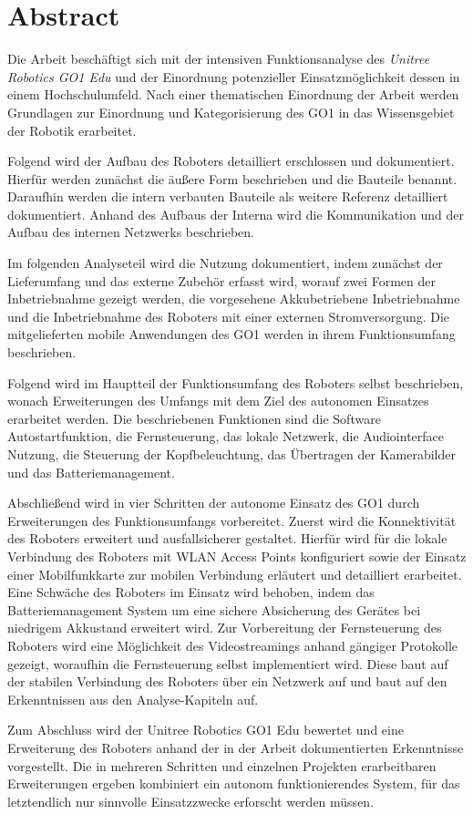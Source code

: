 \clearpage
{}
\pagestyle{empty}
\section*{Abstract}

Die Arbeit \emph{\mytitle{}} beschäftigt sich mit der intensiven Funktionsanalyse des \emph{Unitree Robotics GO1 Edu} und der
Einordnung potenzieller Einsatzmöglichkeit dessen in einem Hochschulumfeld.
Nach einer thematischen Einordnung der Arbeit werden Grundlagen zur Einordnung und Kategorisierung des GO1 in das Wissensgebiet
der Robotik erarbeitet.

Folgend wird der Aufbau des Roboters detailliert erschlossen und dokumentiert.
Hierfür werden zunächst die äußere Form beschrieben und die Bauteile benannt.
Daraufhin werden die intern verbauten Bauteile als weitere Referenz detailliert dokumentiert.
Anhand des Aufbaus der Interna wird die Kommunikation und der Aufbau des internen Netzwerks beschrieben.

Im folgenden Analyseteil wird die Nutzung dokumentiert, indem zunächst der Lieferumfang und das externe Zubehör erfasst wird, worauf zwei
Formen der Inbetriebnahme gezeigt werden, die vorgesehene Akkubetriebene Inbetriebnahme und die Inbetriebnahme
des Roboters mit einer externen Stromversorgung.
Die mitgelieferten mobile Anwendungen des GO1 werden in ihrem Funktionsumfang beschrieben.

Folgend wird im Hauptteil der Funktionsumfang des Roboters selbst beschrieben, wonach Erweiterungen des Umfangs mit
dem Ziel des autonomen Einsatzes erarbeitet werden.
Die beschriebenen Funktionen sind die Software Autostartfunktion, die Fernsteuerung, das lokale Netzwerk,
die Audiointerface Nutzung, die Steuerung der Kopfbeleuchtung, das Übertragen der Kamerabilder und das Batteriemanagement.

Abschließend wird in vier Schritten der autonome Einsatz des GO1 durch Erweiterungen des Funktionsumfangs vorbereitet.
Zuerst wird die Konnektivität des Roboters erweitert und ausfallsicherer gestaltet.
Hierfür wird für die lokale Verbindung des Roboters mit WLAN Access Points konfiguriert sowie der Einsatz einer
Mobilfunkkarte zur mobilen Verbindung erläutert und detailliert erarbeitet.
Eine Schwäche des Roboters im Einsatz wird behoben, indem das Batteriemanagement System um eine sichere Absicherung
des Gerätes bei niedrigem Akkustand erweitert wird.
Zur Vorbereitung der Fernsteuerung des Roboters wird eine Möglichkeit des Videostreamings anhand gängiger Protokolle
gezeigt, woraufhin die Fernsteuerung selbst implementiert wird.
Diese baut auf der stabilen Verbindung des Roboters über ein Netzwerk auf und baut auf den Erkenntnissen aus den Analyse-Kapiteln auf.

Zum Abschluss wird der Unitree Robotics GO1 Edu bewertet und eine Erweiterung des Roboters anhand der in der Arbeit
dokumentierten Erkenntnisse vorgestellt.
Die in mehreren Schritten und einzelnen Projekten erarbeitbaren Erweiterungen ergeben kombiniert ein autonom
funktionierendes System, für das letztendlich nur sinnvolle Einsatzzwecke erforscht werden müssen.

\restoregeometry


